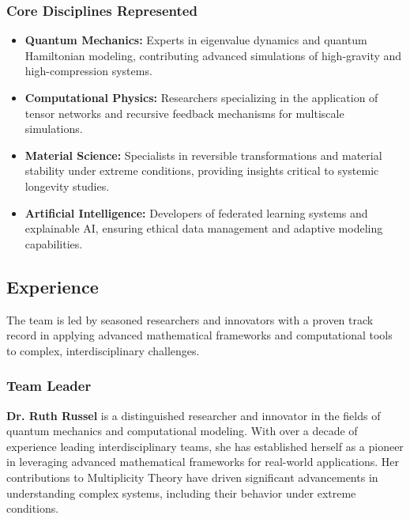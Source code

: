 \documentclass{article}
\theoremstyle{plain}
\begin{document}
\subsubsection*{Core Disciplines Represented}
\begin{itemize}
    \item \textbf{Quantum Mechanics:} Experts in eigenvalue dynamics and quantum Hamiltonian modeling, contributing advanced simulations of high-gravity and high-compression systems.
    \item \textbf{Computational Physics:} Researchers specializing in the application of tensor networks and recursive feedback mechanisms for multiscale simulations.
    \item \textbf{Material Science:} Specialists in reversible transformations and material stability under extreme conditions, providing insights critical to systemic longevity studies.
    \item \textbf{Artificial Intelligence:} Developers of federated learning systems and explainable AI, ensuring ethical data management and adaptive modeling capabilities.
\end{itemize}

\subsection*{Experience}
The team is led by seasoned researchers and innovators with a proven track record in applying advanced mathematical frameworks and computational tools to complex, interdisciplinary challenges.

\subsubsection*{Team Leader}
\textbf{Dr. Ruth Russel} is a distinguished researcher and innovator in the fields of quantum mechanics and computational modeling. With over a decade of experience leading interdisciplinary teams, she has established herself as a pioneer in leveraging advanced mathematical frameworks for real-world applications. Her contributions to Multiplicity Theory have driven significant advancements in understanding complex systems, including their behavior under extreme conditions.
\end{document}
